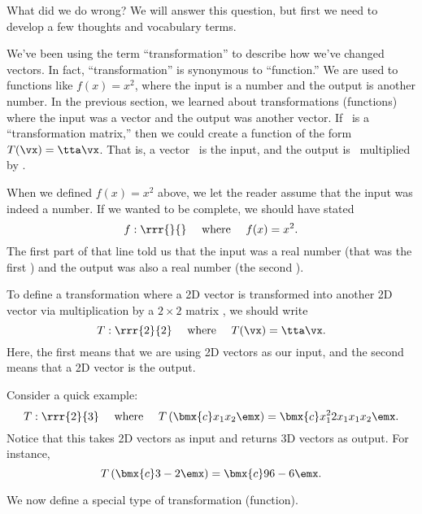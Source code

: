 What did we do wrong? We will answer this question, but first we need to develop a few thoughts and vocabulary terms. 

We've been using the term ``transformation'' to describe how we've changed vectors. In fact, ``transformation'' is synonymous to ``function.'' We are used to functions like $f(x) = x^2$, where the input is a number and the output is another number. In the previous section, we learned about transformations (functions) where the input was a vector and the output was another vector. If \tta\ is a ``transformation matrix,'' then we could create a function of the form $T(\vx) = \tta\vx$. That is, a vector \vx\ is the input, and the output is \vx\ multiplied by \tta.

When we defined $f(x) = x^2$ above, we let the reader assume that the input was indeed a number. If we wanted to be complete, we should have stated 
\[
f:\rrr{}{} \quad \text{ where } \quad f(x)=x^2.
\]
The first part of that line told us that the input was a real number (that was the first \real{}) and the output was also a real number (the second \real{}).

To define a transformation where a 2D vector is transformed into another 2D vector via multiplication by a $2\times 2$ matrix \tta, we should write 
\[
T:\rrr{2}{2} \quad \text{ where } \quad T(\vx) = \tta\vx.
\]
Here, the first  means that we are using 2D vectors as our input, and the second  means that a 2D vector is the output.


Consider a quick example: 
\[
T:\rrr{2}{3} \quad \text{ where } \quad T\left(\bmx{c}x_1\\x_2\emx\right) = \bmx{c}x_1^2\\2x_1\\x_1x_2\emx.
\]
Notice that this takes 2D vectors as input and returns 3D vectors as output. For instance, 
\[
T\left(\bmx{c}3\\-2\emx\right) = \bmx{c}9\\6\\-6\emx.
\]


We now define a special type of transformation (function).

